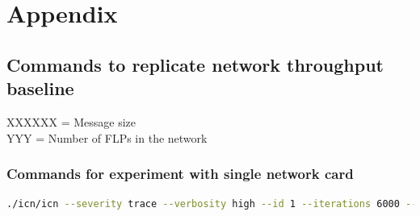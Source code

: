 \documentclass[]{article}
\begin{document}




\section{Appendix}

\subsection{Commands to replicate network throughput baseline}
\label{sec:appendix01}
XXXXXX = Message size \\
YYY = Number of FLPs in the network

\subsubsection{Commands for experiment with single network card}
\begin{lstlisting}[language=bash]
./icn/icn --severity trace --verbosity high --id 1 --iterations 6000 --rate 200 --channel-config name=broadcast,type=pub,method=bind,rateLogging=0,address=tcp://*:5005 name=feedback,type=pull,method=bind,rateLogging=0,address=tcp://*:5000
\end{lstlisting}
\end{document}
